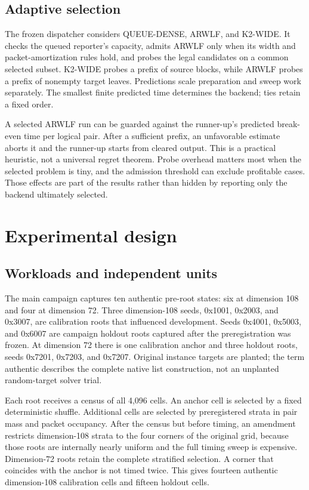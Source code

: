 \documentclass[manuscript,screen,review]{acmart}
\begin{document}
\subsection{Adaptive selection}
The frozen dispatcher considers QUEUE-DENSE, ARWLF, and K2-WIDE. It checks the queued reporter's capacity, admits ARWLF only when its width and packet-amortization rules hold, and probes the legal candidates on a common selected subset. K2-WIDE probes a prefix of source blocks, while ARWLF probes a prefix of nonempty target leaves. Predictions scale preparation and sweep work separately. The smallest finite predicted time determines the backend; ties retain a fixed order.

A selected ARWLF run can be guarded against the runner-up's predicted break-even time per logical pair. After a sufficient prefix, an unfavorable estimate aborts it and the runner-up starts from cleared output. This is a practical heuristic, not a universal regret theorem. Probe overhead matters most when the selected problem is tiny, and the admission threshold can exclude profitable cases. Those effects are part of the results rather than hidden by reporting only the backend ultimately selected.

\section{Experimental design}
\subsection{Workloads and independent units}
The main campaign captures ten authentic pre-root states: six at dimension 108 and four at dimension 72. Three dimension-108 seeds, 0x1001, 0x2003, and 0x3007, are calibration roots that influenced development. Seeds 0x4001, 0x5003, and 0x6007 are campaign holdout roots captured after the preregistration was frozen. At dimension 72 there is one calibration anchor and three holdout roots, seeds 0x7201, 0x7203, and 0x7207. Original instance targets are planted; the term authentic describes the complete native list construction, not an unplanted random-target solver trial.

Each root receives a census of all 4,096 cells. An anchor cell is selected by a fixed deterministic shuffle. Additional cells are selected by preregistered strata in pair mass and packet occupancy. After the census but before timing, an amendment restricts dimension-108 strata to the four corners of the original grid, because those roots are internally nearly uniform and the full timing sweep is expensive. Dimension-72 roots retain the complete stratified selection. A corner that coincides with the anchor is not timed twice. This gives fourteen authentic dimension-108 calibration cells and fifteen holdout cells.
\end{document}
